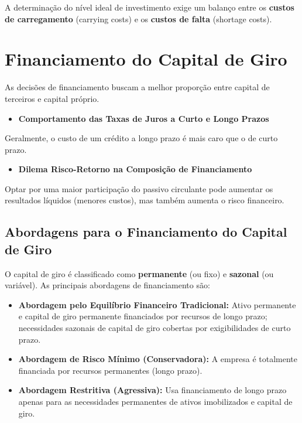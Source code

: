 \documentclass[
  a4paper,
]{book}
\providecommand{\tightlist}{%
  \setlength{\itemsep}{0pt}\setlength{\parskip}{0pt}}\usepackage{longtable,booktabs,array}
\begin{document}
A determinação do nível ideal de investimento exige um balanço entre os
\textbf{custos de carregamento} (carrying costs) e os \textbf{custos de
falta} (shortage costs).

\section{Financiamento do Capital de
Giro}\label{financiamento-do-capital-de-giro}

As decisões de financiamento buscam a melhor proporção entre capital de
terceiros e capital próprio.

\begin{itemize}
\tightlist
\item
  \textbf{Comportamento das Taxas de Juros a Curto e Longo Prazos}
\end{itemize}

Geralmente, o custo de um crédito a longo prazo é mais caro que o de
curto prazo.

\begin{itemize}
\tightlist
\item
  \textbf{Dilema Risco-Retorno na Composição de Financiamento}
\end{itemize}

Optar por uma maior participação do passivo circulante pode aumentar os
resultados líquidos (menores custos), mas também aumenta o risco
financeiro.

\subsection{Abordagens para o Financiamento do Capital de
Giro}\label{abordagens-para-o-financiamento-do-capital-de-giro}

O capital de giro é classificado como \textbf{permanente} (ou fixo) e
\textbf{sazonal} (ou variável). As principais abordagens de
financiamento são:

\begin{itemize}
\tightlist
\item
  \textbf{Abordagem pelo Equilíbrio Financeiro Tradicional:} Ativo
  permanente e capital de giro permanente financiados por recursos de
  longo prazo; necessidades sazonais de capital de giro cobertas por
  exigibilidades de curto prazo.
\item
  \textbf{Abordagem de Risco Mínimo (Conservadora):} A empresa é
  totalmente financiada por recursos permanentes (longo prazo).
\item
  \textbf{Abordagem Restritiva (Agressiva):} Usa financiamento de longo
  prazo apenas para as necessidades permanentes de ativos imobilizados e
  capital de giro.
\end{itemize}
\end{document}
